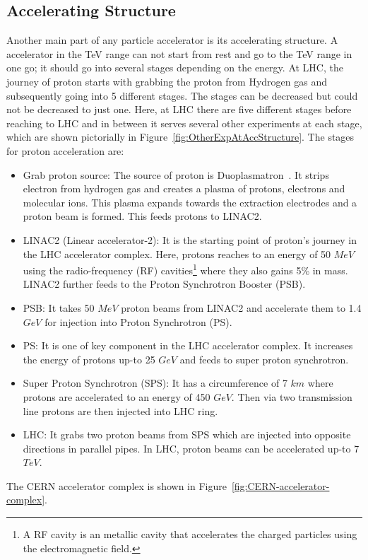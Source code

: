 \subsection{Accelerating Structure} %
\label{sub:accelerating_structure}

Another main part of any particle accelerator is its accelerating structure. A accelerator in the TeV range can not start from rest and go to the TeV range in one go; it should go into several stages depending on the energy. At LHC, the journey of proton starts with grabbing the proton from Hydrogen gas and subsequently going into 5 different stages. The stages can be decreased but could not be decreased to just one. Here, at LHC there are five different stages before reaching to LHC and in between it serves several other experiments at each stage, which are shown pictorially in Figure~\ref{fig:OtherExpAtAccStructure}. The stages for proton acceleration are:
\begin{itemize}
    \item Grab proton source: The source of proton is Duoplasmatron~\cite{LHC-tdr-vol3}. It strips electron from hydrogen gas and creates a plasma of protons, electrons and molecular ions. This plasma expands towards the extraction electrodes and a proton beam is formed. This feeds protons to LINAC2.
    \item LINAC2 (Linear accelerator-2): It is the starting point of proton's journey in the LHC accelerator complex. Here, protons reaches to an energy of 50 $MeV$ using the radio-frequency (RF) cavities\footnote{A RF cavity is an metallic cavity that accelerates the charged particles using the electromagnetic field.} where they also gains 5\% in mass. LINAC2 further feeds to the Proton Synchrotron Booster (PSB).
    \item PSB: It takes 50 $MeV$ proton beams from LINAC2 and accelerate them to 1.4 $GeV$ for injection into Proton Synchrotron (PS).
    \item PS: It is one of key component in the LHC accelerator complex. It increases the energy of protons up-to 25 $GeV$ and feeds to super proton synchrotron.
    \item Super Proton Synchrotron (SPS): It has a circumference of 7 $km$ where protons are accelerated to an energy of 450 $GeV$. Then via two transmission line protons are then injected into LHC ring.
    \item LHC: It grabs two proton beams from SPS which are injected into opposite directions in parallel pipes. In LHC, proton beams can be accelerated up-to 7 $TeV$.
\end{itemize}
The CERN accelerator complex is shown in Figure~\ref{fig:CERN-accelerator-complex}.  

